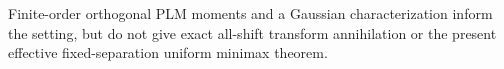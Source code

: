Finite-order orthogonal PLM moments and a Gaussian characterization inform the setting, but do not give exact all-shift transform annihilation or the present effective fixed-separation uniform minimax theorem.